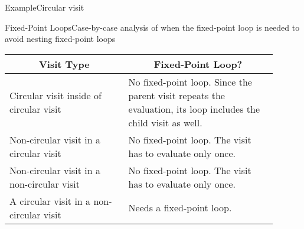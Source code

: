 

\begin{frame}{Example}{Circular visit}


\end{frame}



\begin{frame}{Fixed-Point Loops}{Case-by-case analysis of when the fixed-point loop is needed to avoid nesting fixed-point loops}

{ \small
\begin{tabular}{|p{0.4\linewidth} | p{0.5\linewidth}|}
\hline
\multicolumn{1}{|c|}{Visit Type} & \multicolumn{1}{c|}{Fixed-Point Loop?}   \\ 
\hline\hline
Circular visit inside of circular visit & No fixed-point loop. Since the parent visit repeats the evaluation, its loop includes the child visit as well.\\ \hline
Non-circular visit in a circular visit & No fixed-point loop. The visit has to evaluate only once. \\ \hline
Non-circular visit in a non-circular visit & No fixed-point loop. The visit has to evaluate only once. \\ \hline
A circular visit in a non-circular visit & Needs a fixed-point loop. \\ \hline
\end{tabular} }

\end{frame}

